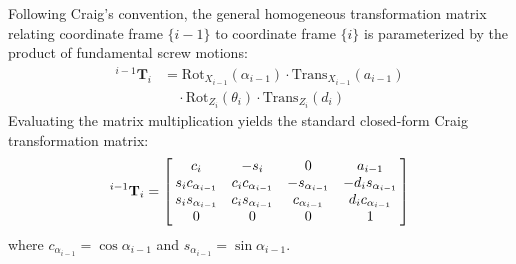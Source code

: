 \documentclass[journal]{IEEEtran}
\begin{document}
\begin{table}[!t]
\centering
\caption{Modified Denavit-Hartenberg (Craig) Parameters and Dynamic Operating Limits (Mathematical Joint Variables)}
\label{table_dh_parameters}
\footnotesize
{}
\end{table}

Following Craig's convention, the general homogeneous transformation matrix relating coordinate frame $\{i-1\}$ to coordinate frame $\{i\}$ is parameterized by the product of fundamental screw motions:
\begin{equation}
\begin{split}
{}^{i-1}\mathbf{T}_i &= \text{Rot}_{X_{i-1}}(\alpha_{i-1}) \cdot \text{Trans}_{X_{i-1}}(a_{i-1}) \\
&\quad \cdot \text{Rot}_{Z_i}(\theta_i) \cdot \text{Trans}_{Z_i}(d_i)
\end{split}
\end{equation}
Evaluating the matrix multiplication yields the standard closed-form Craig transformation matrix:
\begin{equation}
{}^{i-1}\mathbf{T}_i = \left[\begin{array}{@{\hspace{2pt}}cccc@{\hspace{2pt}}}
c_i & -s_i & 0 & a_{i-1} \\
s_i c_{\alpha_{i-1}} & c_i c_{\alpha_{i-1}} & -s_{\alpha_{i-1}} & -d_i s_{\alpha_{i-1}} \\
s_i s_{\alpha_{i-1}} & c_i s_{\alpha_{i-1}} & c_{\alpha_{i-1}} & d_i c_{\alpha_{i-1}} \\
0 & 0 & 0 & 1
\end{array}\right]
\end{equation}
where $c_{\alpha_{i-1}} = \cos\alpha_{i-1}$ and $s_{\alpha_{i-1}} = \sin\alpha_{i-1}$.
\end{document}
